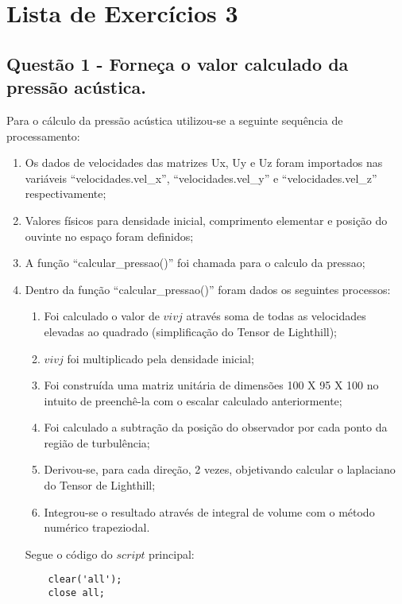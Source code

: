 \tableofcontents*
\cleardoublepage

\chapter{Lista de Exercícios 3}

\section{Questão 1 - Forneça o valor calculado da pressão acústica.}
Para o cálculo da pressão acústica utilizou-se a seguinte sequência de processamento:
\begin{enumerate}
	\item Os dados de velocidades das matrizes Ux, Uy e Uz foram importados nas variáveis
``velocidades.vel\_x'', ``velocidades.vel\_y'' e ``velocidades.vel\_z'' respectivamente;
	\item Valores físicos para densidade inicial, comprimento elementar e posição do ouvinte no espaço foram definidos;
	\item A função ``calcular\_pressao()'' foi chamada para o calculo da pressao;
	\item Dentro da função ``calcular\_pressao()'' foram dados os seguintes processos:
	\begin{enumerate} 
		\item Foi calculado o valor de \begin{math}vivj\end{math} através soma de todas as velocidades elevadas ao quadrado (simplificação do Tensor de Lighthill);
		\item \begin{math}vivj\end{math} foi multiplicado pela densidade inicial;
		\item Foi construída uma matriz unitária de dimensões 100 X 95 X 100 no intuito de preenchê-la com o escalar calculado anteriormente;
		\item Foi calculado a subtração da posição do observador por cada ponto da região de turbulência;
		\item Derivou-se, para cada direção, 2 vezes, objetivando calcular o laplaciano do Tensor de Lighthill;
		\item Integrou-se o resultado através de integral de volume com o método numérico trapeziodal.
	\end{enumerate}

	Segue o código do $script$ principal:
	\begin{lstlisting}
	clear('all');
	close all;


\end{lstlisting}
\end{enumerate}
